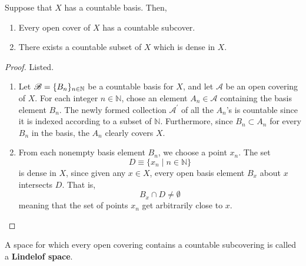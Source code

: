   \begin{theorem}
    Suppose that $X$ has a countable basis. Then, 
    \begin{enumerate}
      \item Every open cover of $X$ has a countable subcover. 
      \item There exists a countable subset of $X$ which is dense in $X$. 
    \end{enumerate}
  \end{theorem}
  \begin{proof}
    Listed. 
    \begin{enumerate}
      \item Let $\operatorname{\mathscr{B}} = \{B_n\}_{n \in \mathbb{N}}$ be a countable basis for $X$, and let $\mathscr{A}$ be an open covering of $X$. For each integer $n \in \mathbb{N}$, chose an element $A_n \in \mathscr{A}$ containing the basis element $B_n$. The newly formed collection $\mathscr{A}^\prime$ of all the $A_n$'s is countable since it is indexed according to a subset of $\mathbb{N}$. Furthermore, since $B_n \subset A_n$ for every $B_n$ in the basis, the $A_n$ clearly covers $X$. 

      \item From each nonempty basis element $B_n$, we choose a point $x_n$. The set 
      \begin{equation}
        D \equiv \{x_n \; | \; n \in \mathbb{N}\}
      \end{equation}
      is dense in $X$, since given any $x \in X$, every open basis element $B_x$ about $x$ intersects $D$. That is, 
      \begin{equation}
        B_x \cap D \neq \emptyset
      \end{equation}
      meaning that the set of points $x_n$ get arbitrarily close to $x$. 
    \end{enumerate}
  \end{proof}

  \begin{definition}
    A space for which every open covering contains a countable subcovering is called a \textbf{Lindelof space}. 
  \end{definition}

